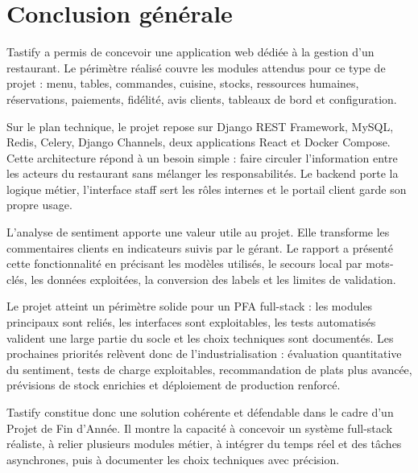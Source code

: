 \chapter*{Conclusion générale}
\label{chap:conclusion}

Tastify a permis de concevoir une application web dédiée à la gestion d'un restaurant. Le périmètre réalisé couvre les modules attendus pour ce type de projet : menu, tables, commandes, cuisine, stocks, ressources humaines, réservations, paiements, fidélité, avis clients, tableaux de bord et configuration.

Sur le plan technique, le projet repose sur Django REST Framework, MySQL, Redis, Celery, Django Channels, deux applications React et Docker Compose. Cette architecture répond à un besoin simple : faire circuler l'information entre les acteurs du restaurant sans mélanger les responsabilités. Le backend porte la logique métier, l'interface staff sert les rôles internes et le portail client garde son propre usage.

L'analyse de sentiment apporte une valeur utile au projet. Elle transforme les commentaires clients en indicateurs suivis par le gérant. Le rapport a présenté cette fonctionnalité en précisant les modèles utilisés, le secours local par mots-clés, les données exploitées, la conversion des labels et les limites de validation.

Le projet atteint un périmètre solide pour un PFA full-stack : les modules principaux sont reliés, les interfaces sont exploitables, les tests automatisés valident une large partie du socle et les choix techniques sont documentés. Les prochaines priorités relèvent donc de l'industrialisation : évaluation quantitative du sentiment, tests de charge exploitables, recommandation de plats plus avancée, prévisions de stock enrichies et déploiement de production renforcé.

Tastify constitue donc une solution cohérente et défendable dans le cadre d'un Projet de Fin d'Année. Il montre la capacité à concevoir un système full-stack réaliste, à relier plusieurs modules métier, à intégrer du temps réel et des tâches asynchrones, puis à documenter les choix techniques avec précision.
